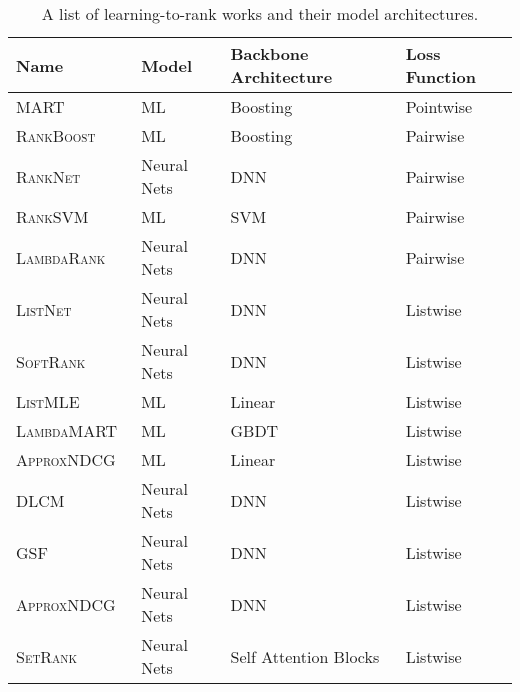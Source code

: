 \begin{table*}[t!]
\centering
{} %
\resizebox{0.9\textwidth}{!}
{
\begin{tabular}{llll}
\toprule
\textbf{Name} & \textbf{Model} & \textbf{Backbone Architecture} & \textbf{Loss Function} \\
\midrule
\textsc{MART}~\cite{friedman2001greedy} & ML & Boosting & Pointwise \\
\textsc{RankBoost}~\citep{freund2003efficient} & ML & Boosting & Pairwise \\
\textsc{RankNet}~\citep{burges2005learning} & Neural Nets & DNN & Pairwise \\ 
\textsc{RankSVM}~\citep{joachims2006training} & ML & SVM & Pairwise \\
\textsc{LambdaRank}~\citep{burges2006learning} & Neural Nets & DNN & Pairwise \\
\textsc{ListNet}~\cite{cao2007learning} & Neural Nets & DNN & Listwise \\
\textsc{SoftRank}~\citep{taylor2008softrank} & Neural Nets & DNN & Listwise  \\
\textsc{ListMLE}~\citep{xia2008listwise} & ML & Linear & Listwise\\
\textsc{LambdaMART}~\citep{burges2010ranknet} & ML & GBDT & Listwise \\
\textsc{ApproxNDCG}~\citep{qin2010general} & ML & Linear & Listwise \\
\textsc{DLCM}~\citep{ai2018learning} & Neural Nets & DNN & Listwise  \\
\textsc{GSF}~\citep{ai2019learning} & Neural Nets & DNN & Listwise \\
\textsc{ApproxNDCG}~\citep{bruch2019revisiting} & Neural Nets &  DNN & Listwise \\
\textsc{SetRank}~\citep{pang2020setrank} & Neural Nets & Self Attention Blocks & Listwise\\

\bottomrule
\end{tabular}
}
\caption{A list of learning-to-rank works and their model architectures.}
\label{tab:ltr_model_appendix}
\end{table*}